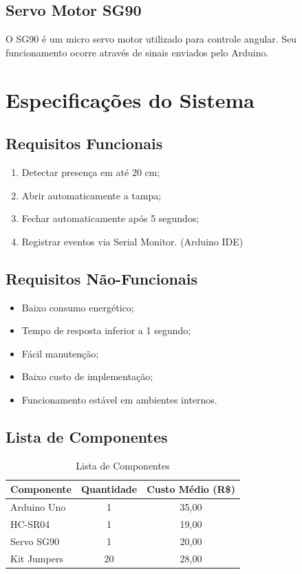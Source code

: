\documentclass[12pt, openany, oneside, a4paper, brazilian]{abntex2}
\begin{document}
\section{Servo Motor SG90}

O SG90 é um micro servo motor utilizado para controle angular. Seu funcionamento ocorre através de sinais enviados pelo Arduino.


\chapter{Especificações do Sistema}

\section{Requisitos Funcionais}

\begin{enumerate}
    \item Detectar presença em até 20 cm;
    \item Abrir automaticamente a tampa;
    \item Fechar automaticamente após 5 segundos;
    \item Registrar eventos via Serial Monitor. (Arduino IDE)
\end{enumerate}

\section{Requisitos Não-Funcionais}

\begin{itemize}
    \item Baixo consumo energético;
    \item Tempo de resposta inferior a 1 segundo;
    \item Fácil manutenção;
    \item Baixo custo de implementação;
    \item Funcionamento estável em ambientes internos.
\end{itemize}

\section{Lista de Componentes}

\begin{table}[H]
\centering
\caption{Lista de Componentes}
\begin{tabular}{lcc}
\toprule
Componente & Quantidade & Custo Médio (R\$) \\
\midrule
Arduino Uno & 1 & 35,00 \\
HC-SR04 & 1 & 19,00 \\
Servo SG90 & 1 & 20,00 \\
Kit Jumpers & 20 & 28,00 \\
\bottomrule
\end{tabular}
\end{table}
\end{document}
